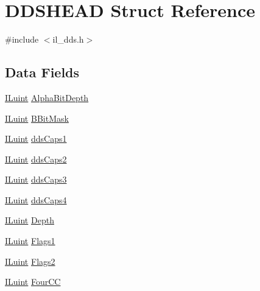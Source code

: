 \hypertarget{struct_d_d_s_h_e_a_d}{\section{D\-D\-S\-H\-E\-A\-D Struct Reference}
\label{struct_d_d_s_h_e_a_d}
}


{\ttfamily \#include $<$il\-\_\-dds.\-h$>$}

\subsection*{Data Fields}
\begin{DoxyCompactItemize}
\item 
\hyperlink{il_8h_ac6508d0e9c19e32f32e00d54b5b8cf30}{I\-Luint} \hyperlink{struct_d_d_s_h_e_a_d_a852d7999bb4fffcbe1d304609f35061c}{Alpha\-Bit\-Depth}
\item 
\hyperlink{il_8h_ac6508d0e9c19e32f32e00d54b5b8cf30}{I\-Luint} \hyperlink{struct_d_d_s_h_e_a_d_acfc15251c33bf0479c8035359cb83922}{B\-Bit\-Mask}
\item 
\hyperlink{il_8h_ac6508d0e9c19e32f32e00d54b5b8cf30}{I\-Luint} \hyperlink{struct_d_d_s_h_e_a_d_a44446bceeba415b836fda77b91b83029}{dds\-Caps1}
\item 
\hyperlink{il_8h_ac6508d0e9c19e32f32e00d54b5b8cf30}{I\-Luint} \hyperlink{struct_d_d_s_h_e_a_d_a9637e21e09ad10cee36a56b6908b51c4}{dds\-Caps2}
\item 
\hyperlink{il_8h_ac6508d0e9c19e32f32e00d54b5b8cf30}{I\-Luint} \hyperlink{struct_d_d_s_h_e_a_d_a235e66aa9042bd2c675fb40c8560943b}{dds\-Caps3}
\item 
\hyperlink{il_8h_ac6508d0e9c19e32f32e00d54b5b8cf30}{I\-Luint} \hyperlink{struct_d_d_s_h_e_a_d_a436fdf72d6a7f0e4a04d735f334124dd}{dds\-Caps4}
\item 
\hyperlink{il_8h_ac6508d0e9c19e32f32e00d54b5b8cf30}{I\-Luint} \hyperlink{struct_d_d_s_h_e_a_d_a2a4c47a9713bee335a0830b336bdc951}{Depth}
\item 
\hyperlink{il_8h_ac6508d0e9c19e32f32e00d54b5b8cf30}{I\-Luint} \hyperlink{struct_d_d_s_h_e_a_d_a2e1f95f2f3a00d20b1986a287532da86}{Flags1}
\item 
\hyperlink{il_8h_ac6508d0e9c19e32f32e00d54b5b8cf30}{I\-Luint} \hyperlink{struct_d_d_s_h_e_a_d_acbc5caf5d75a742e2c9423ddda196172}{Flags2}
\item 
\hyperlink{il_8h_ac6508d0e9c19e32f32e00d54b5b8cf30}{I\-Luint} \hyperlink{struct_d_d_s_h_e_a_d_a4e26e1f99f127caed367a848a0389083}{Four\-C\-C}
\item 

\end{DoxyCompactItemize}
